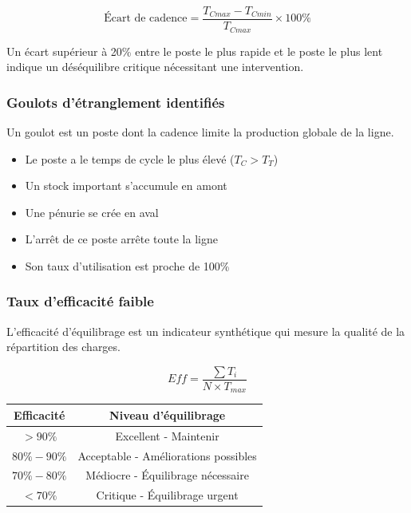 \documentclass[12pt,a4paper]{article}
\newenvironment{importantnote}
  {\begin{tcolorbox}[colback=blue!5!white, colframe=blue!50!black, title=\textbf{Point Important}]\small}
  {\end{tcolorbox}}
\newenvironment{methodbox}[1]
  {\begin{tcolorbox}[colback=blue!5!white, colframe=methodcolor, title=#1]\small}
  {\end{tcolorbox}}
\begin{document}
\[
\text{Écart de cadence} = \frac{T_{Cmax} - T_{Cmin}}{T_{Cmax}} \times 100\%
\]

\begin{importantnote}
Un écart supérieur à 20\% entre le poste le plus rapide et le poste le plus lent indique un déséquilibre critique nécessitant une intervention.
\end{importantnote}

\subsubsection{Goulots d'étranglement identifiés}

Un goulot est un poste dont la cadence limite la production globale de la ligne.

\begin{methodbox}{Caractéristiques d'un goulot}
\begin{itemize}
    \item Le poste a le temps de cycle le plus élevé ($T_C > T_T$)
    \item Un stock important s'accumule en amont
    \item Une pénurie se crée en aval
    \item L'arrêt de ce poste arrête toute la ligne
    \item Son taux d'utilisation est proche de 100\%
\end{itemize}
\end{methodbox}

\subsubsection{Taux d'efficacité faible}

L'efficacité d'équilibrage est un indicateur synthétique qui mesure la qualité de la répartition des charges.

\[
\boxed{Eff = \frac{\sum T_i}{N \times T_{max}}}
\]

\begin{center}
\begin{tabular}{|c|c|}
\hline
\textbf{Efficacité} & \textbf{Niveau d'équilibrage} \\
\hline
$> 90\%$ & Excellent - Maintenir \\
\hline
$80\% - 90\%$ & Acceptable - Améliorations possibles \\
\hline
$70\% - 80\%$ & Médiocre - Équilibrage nécessaire \\
\hline
$< 70\%$ & Critique - Équilibrage urgent \\
\hline
\end{tabular}
\end{center}
\end{document}
